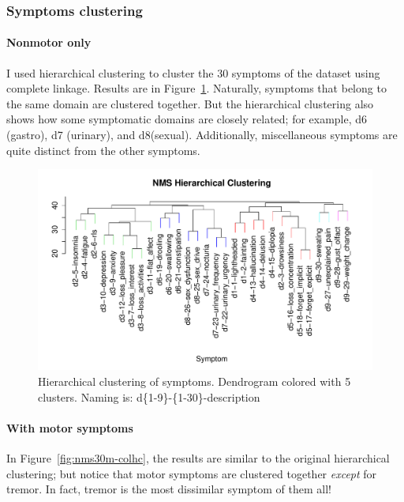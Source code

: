 \documentclass[10pt]{article}
\begin{document}
\begin{multicols}{2}
\subsubsection{Symptoms clustering}

\paragraph{Nonmotor only}

I used hierarchical clustering to cluster the 30 symptoms of the dataset using complete linkage.
Results are in Figure~\ref{fig:nms30only-colhc}. Naturally, symptoms that belong to the same domain are
clustered together. But the hierarchical clustering also shows how some symptomatic domains are
closely related; for example, d6 (gastro), d7 (urinary), and d8(sexual). Additionally,
miscellaneous symptoms are quite distinct from the other symptoms.

\begin{figure}[p]
  \centering
  \includegraphics[width=\linewidth]{nms30only-colhc.pdf} \caption{Hierarchical clustering of symptoms.
    Dendrogram colored with 5 clusters. Naming is: d\{1-9\}-\{1-30\}-description}
  \label{fig:nms30only-colhc}
\end{figure}

\paragraph{With motor symptoms}

In Figure~\ref{fig:nms30m-colhc}, the results are similar to the original hierarchical
clustering; but notice that motor symptoms are clustered together \emph{except} for tremor. In
fact, tremor is the most dissimilar symptom of them all!


\end{multicols}
\end{document}
